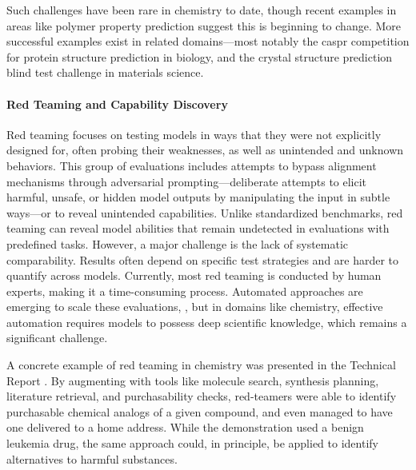 Such challenges have been rare in chemistry to date, though recent examples in areas like polymer property prediction \autocite{gang2025neurips} suggest this is beginning to change. 
More successful examples exist in related domains---most notably the \gls{caspr} competition\autocite{Moult2005} for protein structure prediction in biology, and the crystal structure prediction blind test challenge\autocite{Lommerse2000} in materials science.

\paragraph{Red Teaming and Capability Discovery} \label{para:red_teaming}
Red teaming focuses on testing models in ways that they were not explicitly designed for, often probing their weaknesses, as well as unintended and unknown behaviors. \autocite{perez2022red, ganguli2022red} 
This group of evaluations includes attempts to bypass alignment mechanisms through adversarial prompting---deliberate attempts to elicit harmful, unsafe, or hidden model outputs by manipulating the input in subtle ways---or to reveal unintended capabilities. \autocite{zhu2023prompt, kumar2023computation} 
Unlike standardized benchmarks, red teaming can reveal model abilities that remain undetected in evaluations with predefined tasks. However, a major challenge is the lack of systematic comparability. 
Results often depend on specific test strategies and are harder to quantify across models. Currently, most red teaming is conducted by human experts, making it a time-consuming process. Automated approaches are emerging to scale these evaluations, \autocite{ge2023mart0}, but in domains like chemistry, effective automation requires models to possess deep scientific knowledge, which remains a significant challenge. 

A concrete example of red teaming in chemistry was presented in the  Technical Report \autocite{openai2023gpt04}. 
By augmenting  with tools like molecule search, synthesis planning, literature retrieval, and purchasability checks, red-teamers were able to identify purchasable chemical analogs of a given compound, and even managed to have one delivered to a home address. 
While the demonstration used a benign leukemia drug, the same approach could, in principle, be applied to identify alternatives to harmful substances.\autocite{urbina2022dual}

